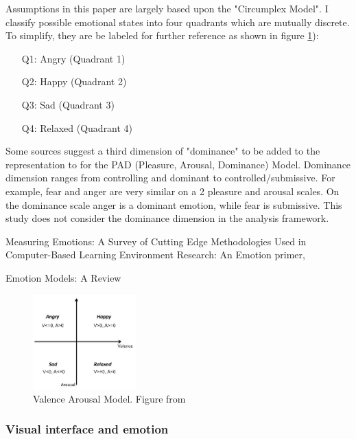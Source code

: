 		Assumptions in this paper are largely based upon the "Circumplex Model". I classify possible emotional states into four quadrants which are mutually discrete. To simplify, they are be labeled for further reference as shown in figure \ref{fig:valence_arousal_model}):
		\begin{enumerate}
			\item[Q1:] Angry 	(Quadrant 1)
			\item[Q2:] Happy 	(Quadrant 2)
			\item[Q3:] Sad 		(Quadrant 3)
			\item[Q4:] Relaxed 	(Quadrant 4)
		\end{enumerate}
		
		Some sources suggest a third dimension of "dominance" to be added to the representation to for the PAD (Pleasure, Arousal, Dominance) Model. Dominance dimension ranges from controlling and dominant to controlled/submissive. For example, fear and anger are very similar on a 2 pleasure and arousal scales. On the dominance scale anger is a dominant emotion, while fear is submissive. \cite{Mehrabian1974}
		This study does not consider the dominance dimension in the analysis framework. 
		
		\cite{Harley2016} Measuring Emotions: A Survey of Cutting Edge Methodologies Used in Computer-Based Learning Environment Research: An Emotion primer, 
		
		\cite{SreejaPSMahalakshmi2017} Emotion Models: A Review
		
		\begin{figure}
			\begin{center}
				\includegraphics[width=150px]{graphics/Valence-Arousal-model-showing-the-quadrants-of-the-four-emotion-tags-used-in-this_W640.jpg}
				\caption{Valence Arousal Model. Figure from \cite{Song2013} \label{fig:valence_arousal_model}}
				
			\end{center}
		\end{figure}
		
		\subsubsection{Visual interface and emotion}
		

